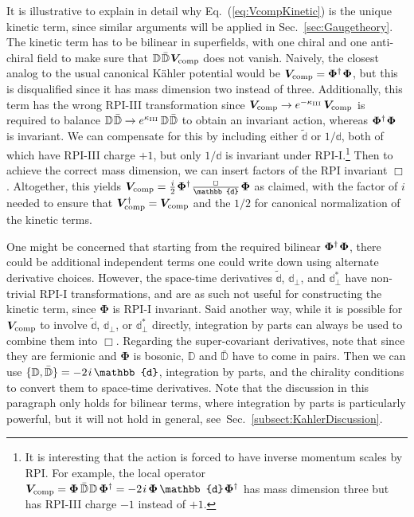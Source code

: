 \documentclass[12pt,document,nofootinbib,superscriptaddress,onecolumn,preprintnumbers,balancelastpage]{article}
\newcommand{\rpiiii}{{\kappa_\text{III}}}
\newcommand{\s}{\hspace{0.8pt}}
\newcommand{\PP}{\mathbb{d}}
\DeclareRobustCommand{\Sec}[1]{Sec.~\ref{#1}}
\DeclareRobustCommand{\Eq}[1]{Eq.~(\ref{#1})}
\newcommand{\D}{\mathbb{D}}
\newcommand{\Dbar}{\bar{\mathbb{D}}}
\newcommand{\bPhi}{\boldsymbol{\Phi}}
\newcommand{\bV}{\boldsymbol{V}}
\begin{document}
\begin{spacing}{1.2}
It is illustrative to explain in detail why \Eq{eq:VcompKinetic} is the unique kinetic term, since similar arguments will be applied in \Sec{sec:Gaugetheory}.
%
The kinetic term has to be bilinear in superfields, with one chiral and one anti-chiral field to make sure that $\D\s \bar{\D}\s \bV_{\rm comp}$ does not vanish.
%
Naively, the closest analog to the usual canonical K\"ahler potential would be $\bV_{\rm comp} = \bPhi^\dagger\s \bPhi$, but this is disqualified since it has mass dimension two instead of three.
%
Additionally, this term has the wrong RPI-III transformation since $\bV_{\rm comp} \to e^{-\rpiiii} \,\bV_{\rm comp}$ is required to balance $\D\s\bar{\D} \to e^\rpiiii \,\D\s\bar{\D}$ to obtain an invariant action, whereas $\bPhi^\dagger \s\bPhi$ is invariant.
%
We can compensate for this by including either $\tilde{\PP}$ or $1/\PP$, both of which have RPI-III charge $+1$, but only $1/\PP$ is invariant under RPI-I.\footnote{It is interesting that the action is forced to have inverse momentum scales by RPI.  For example, the local operator $\bV_{\rm comp} = \bPhi\, \Dbar\s \D\,  \bPhi^\dagger = -2\s i\, \bPhi\, \PP\s\bPhi^\dagger$ has mass dimension three but has RPI-III charge $-1$ instead of $+1$.}
%
Then to achieve the correct mass dimension, we can insert factors of the RPI invariant $\Box$.
%
Altogether, this yields $\bV_{\rm comp} = \frac{i}{2}\s\bPhi^\dagger\s \frac{\Box}{\PP} \s\bPhi$ as claimed, with the factor of $i$ needed to ensure that $\bV_{\rm comp}^\dagger = \bV_{\rm comp}$ and the $1/2$ for canonical normalization of the kinetic terms.

One might be concerned that starting from the required bilinear $\bPhi^\dagger\s \bPhi$, there could be additional independent terms one could write down using alternate derivative choices.
%
However, the space-time derivatives $\tilde{\PP}$, $\PP_\perp$, and $\PP_\perp^*$ have non-trivial RPI-I transformations, and are as such not useful for constructing the kinetic term, since $\bPhi$ is RPI-I invariant.
%
Said another way, while it is possible for $\bV_{\rm comp}$ to involve $\tilde{\PP}$, $\PP_\perp$, or $\PP_\perp^*$ directly, integration by parts can always be used to combine them into $\Box$.
%
Regarding the super-covariant derivatives, note that since they are fermionic and $\bPhi$ is bosonic, $\D$ and $\bar{\D}$ have to come in pairs.  Then we can use $\{ \D, \bar{\D}  \} = -2\s i\,\PP$, integration by parts, and the chirality conditions to convert them to space-time derivatives.
%
Note that the discussion in this paragraph only holds for bilinear terms, where integration by parts is particularly powerful, but it will not hold in general, see~\Sec{subsect:KahlerDiscussion}.
%


\end{spacing}
\end{document}
